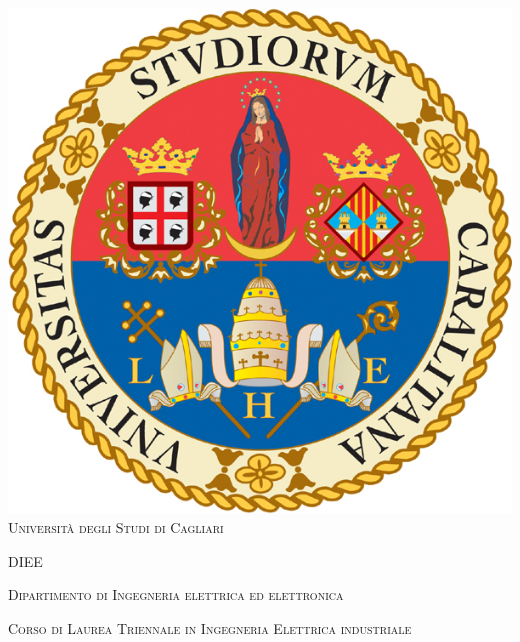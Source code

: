 \begin{titlepage}
	\begin{center}
		
		\includegraphics[scale=.45]{./title/logo_CA.jpg}
		\\
		\vspace{1cm}
		\textsc{\large Università degli Studi di Cagliari}
		\vspace{1.2cm}
		
		\textsc{\Large DIEE}
		\vspace{0.5cm}
		
		\textsc{\large Dipartimento di Ingegneria elettrica ed elettronica}
		\vspace{1.0cm}
		
		\textsc{\large Corso di Laurea {Triennale} in Ingegneria Elettrica industriale}\hspace{0.8cm}
		
		\vspace{0.8cm}
		

\end{center}
\end{titlepage}
